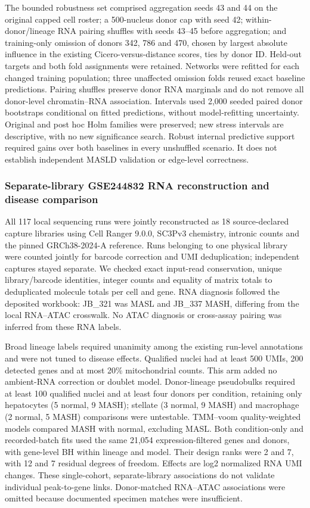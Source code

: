 The bounded robustness set comprised aggregation seeds 43 and 44 on the original capped cell roster; a 500-nucleus donor cap with seed 42; within-donor/lineage RNA pairing shuffles with seeds 43--45 before aggregation; and training-only omission of donors 342, 786 and 470, chosen by largest absolute influence in the existing Cicero-versus-distance scores, ties by donor ID. Held-out targets and both fold assignments were retained. Networks were refitted for each changed training population; three unaffected omission folds reused exact baseline predictions. Pairing shuffles preserve donor RNA marginals and do not remove all donor-level chromatin--RNA association. Intervals used 2,000 seeded paired donor bootstraps conditional on fitted predictions, without model-refitting uncertainty. Original and post hoc Holm families were preserved; new stress intervals are descriptive, with no new significance search. Robust internal predictive support required gains over both baselines in every unshuffled scenario. It does not establish independent MASLD validation or edge-level correctness.

\subsubsection{Separate-library GSE244832 RNA reconstruction and disease comparison}\label{separate-library-gse244832-rna-reconstruction-and-disease-comparison}

All 117 local sequencing runs were jointly reconstructed as 18 source-declared capture libraries using Cell Ranger 9.0.0, SC3Pv3 chemistry, intronic counts and the pinned GRCh38-2024-A reference. Runs belonging to one physical library were counted jointly for barcode correction and UMI deduplication; independent captures stayed separate. We checked exact input-read conservation, unique library/barcode identities, integer counts and equality of matrix totals to deduplicated molecule totals per cell and gene. RNA diagnosis followed the deposited workbook: JB\_\allowbreak{}321 was MASL and JB\_\allowbreak{}337 MASH, differing from the local RNA--ATAC crosswalk. No ATAC diagnosis or cross-assay pairing was inferred from these RNA labels.

Broad lineage labels required unanimity among the existing run-level annotations and were not tuned to disease effects. Qualified nuclei had at least 500 UMIs, 200 detected genes and at most 20\% mitochondrial counts. This arm added no ambient-RNA correction or doublet model. Donor-lineage pseudobulks required at least 100 qualified nuclei and at least four donors per condition, retaining only hepatocytes (5 normal, 9 MASH); stellate (3 normal, 9 MASH) and macrophage (2 normal, 5 MASH) comparisons were untestable. TMM--voom quality-weighted models compared MASH with normal, excluding MASL. Both condition-only and recorded-batch fits used the same 21,054 expression-filtered genes and donors, with gene-level BH within lineage and model. Their design ranks were 2 and 7, with 12 and 7 residual degrees of freedom. Effects are log2 normalized RNA UMI changes. These single-cohort, separate-library associations do not validate individual peak-to-gene links. Donor-matched RNA--ATAC associations were omitted because documented specimen matches were insufficient.

